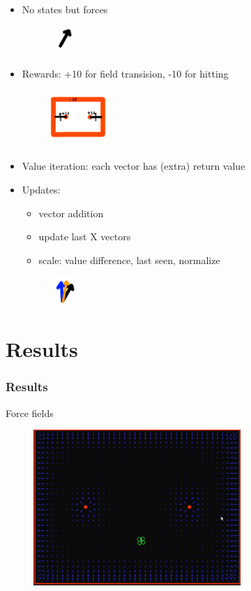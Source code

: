 \documentclass[10pt]{beamer}
\begin{document}
\begin{frame}
  \begin{itemize}
   \item No states but forces
   \begin{figure}
    \includegraphics[width=0.1\textwidth]{img/rl_force}
   \end{figure}
   \item Rewards: +10 for field transision, -10 for hitting
   \begin{figure}
    \includegraphics[width=0.2\textwidth]{img/rl_rewards}
   \end{figure}
   \item Value iteration: each vector has (extra) return value
   \item Updates:
   \begin{itemize}
    \item vector addition
    \item update last X vectors
    \item scale: value difference, last seen, normalize
   \end{itemize}
   \begin{figure}
    \includegraphics[width=0.1\textwidth]{img/rl_add}
   \end{figure}
  \end{itemize}
\end{frame}

\section{Results}
\begin{frame}
 \frametitle{Results}
 Force fields
 \begin{figure}
  \includegraphics[width=0.7\textwidth]{img/force_fields}
 \end{figure}
\end{frame}
\end{document}
